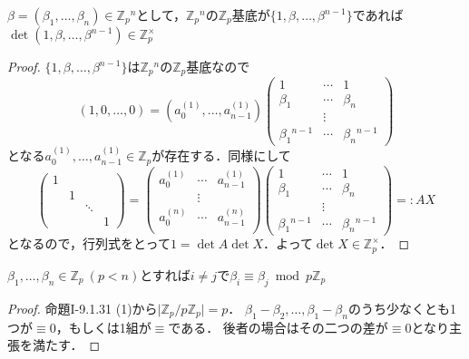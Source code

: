 \begin{screen}
  $\beta = (\beta_1, \ldots, \beta_n)\in\mathbb{Z}_p{}^n$として，$\mathbb{Z}_p{}^n$の$\mathbb{Z}_p$基底が$\{1, \beta, \ldots, \beta^{n-1}\}$であれば$\det(1, \beta, \ldots, \beta^{n-1})\in\mathbb{Z}_p^\times$
\end{screen}
\begin{proof}
  $\{1, \beta, \ldots, \beta^{n-1}\}$は$\mathbb{Z}_p{}^n$の$\mathbb{Z}_p$基底なので
  \[(1, 0, \ldots, 0)=(a_0^{(1)}, \ldots, a_{n-1}^{(1)})
  \begin{pmatrix}
    1               & \cdots & 1\\
    \beta_1         & \cdots & \beta_n\\
    & \vdots & \\
    \beta_1{}^{n-1} & \cdots & \beta_n{}^{n-1}
  \end{pmatrix}
  \]
  となる$a_0^{(1)}, \ldots, a_{n-1}^{(1)}\in\mathbb{Z}_p$が存在する．同様にして
  \[
  \begin{pmatrix}
    1 &   &        & \\
    & 1 &        & \\
    &   & \ddots & \\
    &   &        & 1
  \end{pmatrix}
  =
  \begin{pmatrix}
    a_0^{(1)} & \cdots & a_{n-1}^{(1)} \\
    & \vdots & \\
    a_0^{(n)} & \cdots & a_{n-1}^{(n)} \\
  \end{pmatrix}
  \begin{pmatrix}
    1               & \cdots & 1\\
    \beta_1         & \cdots & \beta_n\\
    & \vdots & \\
    \beta_1{}^{n-1} & \cdots & \beta_n{}^{n-1}
  \end{pmatrix}
  =:AX
  \]
  となるので，行列式をとって$1=\det A\det X$．よって$\det X\in\mathbb{Z}_p^\times$．
\end{proof}

\begin{screen}
  $\beta_1, \ldots, \beta_n\in\mathbb{Z}_p\ (p< n)$とすれば$i\neq j$で$\beta_i\equiv\beta_j\bmod p\mathbb{Z}_p$
\end{screen}
\begin{proof}
  命題I-9.1.31 (1)から$\lvert\mathbb{Z}_p/p\mathbb{Z}_p\rvert=p$．
  $\beta_1-\beta_2, \ldots, \beta_1-\beta_n$のうち少なくとも1つが$\equiv0$，もしくは1組が$\equiv$である．
  後者の場合はその二つの差が$\equiv0$となり主張を満たす．
\end{proof}

